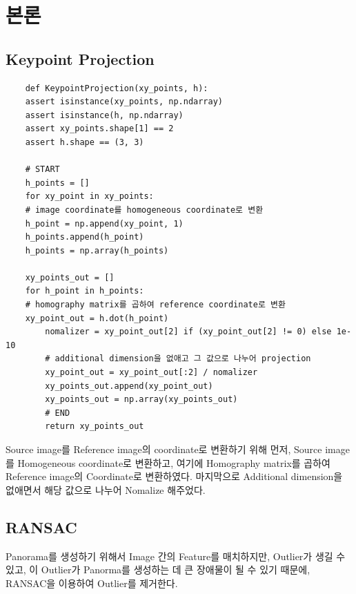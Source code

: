 \documentclass[]{report}
\begin{document}
\chapter{본론}

\section{Keypoint Projection}

\begin{lstlisting}
    def KeypointProjection(xy_points, h):
    assert isinstance(xy_points, np.ndarray)
    assert isinstance(h, np.ndarray)
    assert xy_points.shape[1] == 2
    assert h.shape == (3, 3)
    
    # START
    h_points = []
    for xy_point in xy_points:
    # image coordinate를 homogeneous coordinate로 변환
    h_point = np.append(xy_point, 1)
    h_points.append(h_point)
    h_points = np.array(h_points)
    
    xy_points_out = []
    for h_point in h_points:
    # homography matrix를 곱하여 reference coordinate로 변환
    xy_point_out = h.dot(h_point)
        nomalizer = xy_point_out[2] if (xy_point_out[2] != 0) else 1e-10
        # additional dimension을 없애고 그 값으로 나누어 projection
        xy_point_out = xy_point_out[:2] / nomalizer
        xy_points_out.append(xy_point_out)
        xy_points_out = np.array(xy_points_out)
        # END
        return xy_points_out
    \end{lstlisting}

Source image를 Reference image의 coordinate로 변환하기 위해 먼저, Source image를 Homogeneous coordinate로 변환하고,
여기에 Homography matrix를 곱하여 Reference image의 Coordinate로 변환하였다. 마지막으로 Additional dimension을 없애면서 해당 값으로 나누어 Nomalize 해주었다.\\


\section{RANSAC}

Panorama를 생성하기 위해서 Image 간의 Feature를 매치하지만,
Outlier가 생길 수 있고, 이 Outlier가 Panorma를 생성하는 데 큰 장애물이 될 수 있기 때문에,
RANSAC을 이용하여 Outlier를 제거한다. \\ 
\end{document}
